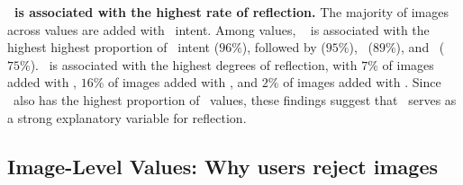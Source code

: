 
\textbf{\diversity~is associated with the highest rate of reflection.}
The majority of images across values are added with \direct~intent. Among values, \aesthetics~ is associated with the highest highest proportion of \direct~intent ($96\%$), followed by \familiarity($95\%$), \realism~($89\%$), and \diversity~($75\%$). \diversity~is associated with the highest degrees of reflection, with $7\%$ of images added with \reminder, $16\%$ of images added with \expansion, and $2\%$ of images added with \challenge. Since \agonistic~also has the highest proportion of \diversity~values, these findings suggest that \diversity~serves as a strong explanatory variable for reflection.


\subsection{Image-Level Values: Why users reject images}
\label{why-reject}




